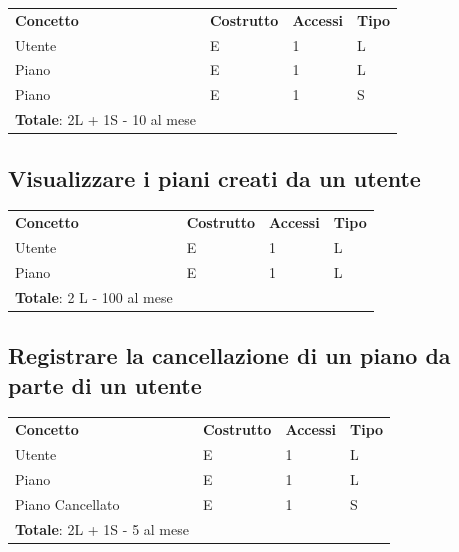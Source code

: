 \documentclass[a4paper,12pt]{report}
\begin{document}
\begin{table}[!htb]
\begin{center}
	\begin{tabular}{ | m{5cm} P{4cm} P{4cm} P{4cm} | }
	\textbf{Concetto} & \textbf{Costrutto} & \textbf{Accessi} & \textbf{Tipo} \\
	Utente & E & 1 & L \\ \hline
	Piano & E & 1 & L \\ \hline
	Piano & E & 1 & S \\ \hline
	\textbf{Totale}: 2L + 1S - 10 al mese & & & \\
	\hline
	\end{tabular}
\end{center}
\end{table}

\subsection*{Visualizzare i piani creati da un utente}

\begin{table}[!htb]
\begin{center}
	\begin{tabular}{ | m{5cm} P{4cm} P{4cm} P{4cm} | }
	\textbf{Concetto} & \textbf{Costrutto} & \textbf{Accessi} & \textbf{Tipo} \\
	Utente & E & 1 & L \\ \hline
	Piano & E & 1 & L \\ \hline
	\textbf{Totale}: 2 L - 100 al mese & & & \\
	\hline
	\end{tabular}
\end{center}
\end{table}

\subsection*{Registrare la cancellazione di un piano da parte di un utente}

\begin{table}[!htb]
\begin{center}
	\begin{tabular}{ | m{5cm} P{4cm} P{4cm} P{4cm} | }
	\textbf{Concetto} & \textbf{Costrutto} & \textbf{Accessi} & \textbf{Tipo} \\
	Utente & E & 1 & L \\ \hline
	Piano & E & 1 & L \\ \hline
	Piano Cancellato & E & 1 & S \\ \hline
	\textbf{Totale}: 2L + 1S - 5 al mese & & & \\
	\hline
	\end{tabular}
\end{center}
\end{table}
\end{document}
